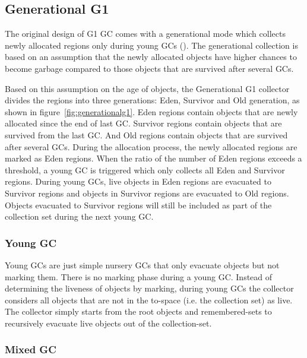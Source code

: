\subsection{Generational G1}

The original design of G1 GC comes with a generational mode which collects newly allocated regions only during young GCs (\cite{detlefs2004garbage}).
The generational collection is based on an assumption that the newly allocated objects
have higher chances to become garbage compared to those objects that are survived after several GCs.

Based on this assumption on the age of objects, the Generational G1 collector divides the regions into three generations: Eden, Survivor and Old generation,
as shown in figure~\ref{fig:generationalg1}.
Eden regions contain objects that are newly allocated since the end of last GC.
Survivor regions contain objects that are survived from the last GC.
And Old regions contain objects that are survived after several GCs.
During the allocation process, the newly allocated regions are marked as Eden regions.
When the ratio of the number of Eden regions exceeds a  threshold,
a young GC is triggered which only collects all Eden and Survivor regions.
During young GCs, live objects in Eden regions are evacuated to Survivor regions
and objects in Survivor regions are evacuated to Old regions.
Objects evacuated to Survivor regions will still be included as part of the collection set during the next young GC.

\begin{figure*}
  \centering
  \texttt{[image: \{figs/generational.png]}}
  \caption{Generational G1 Heap Structure}
  \label{fig:generationalg1}
\end{figure*}

\subsubsection{Young GC}

Young GCs are just simple nursery GCs that only evacuate objects but not marking them.
There is no marking phase during a young GC. Instead of determining the liveness of objects
by marking, during young GCs the collector considers all objects that are not in the
to-space (i.e. the collection set) as live. The collector simply starts from the root
objects and remembered-sets to recursively evacuate live objects out of the collection-set.

\subsubsection{Mixed GC}

